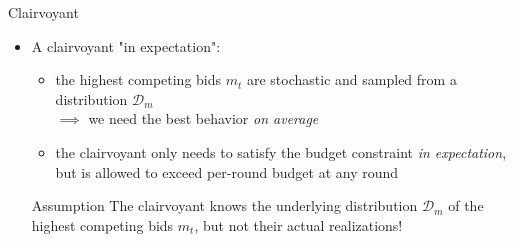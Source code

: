 \begin{frame}[fragile]{Clairvoyant}
    \begin{itemize}
        \item A clairvoyant "in expectation":
        \begin{itemize}
            \item the highest competing bids $m_t$ are stochastic and sampled from a distribution $\mathcal{D}_m$ \\
            $\implies$ we need the best behavior \emph{on average}
            \item the clairvoyant only needs to satisfy the budget constraint \emph{in expectation}, but is allowed to exceed per-round budget at any round
        \end{itemize}
        
        \begin{block}{Assumption} 
        The clairvoyant knows the underlying distribution $\mathcal{D}_m$ of the highest competing bids $m_t$, but not their actual realizations!
        \end{block}
    \end{itemize}

\end{frame}

